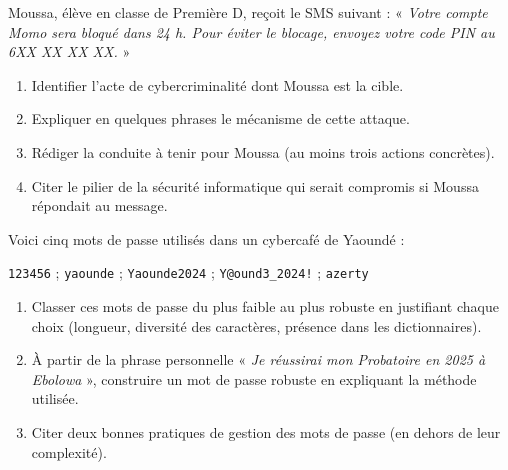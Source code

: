 \documentclass[11pt]{article}
\newcounter{popsec}
\newcounter{popsub}
\newcommand{\courssub}[1]{%
  \stepcounter{popsub}%
  \par\vspace{9pt}\noindent{\popxbold\fontsize{11.5}{13}\selectfont\color{popink}{\color{poporange}\thepopsec.\thepopsub}\hspace{6pt}#1}\par\nopagebreak\vspace{4pt}
}
\begin{document}
\courssub{Je m'entraîne}

\begin{exercice}
Moussa, élève en classe de Première D, reçoit le SMS suivant : « \emph{Votre compte Momo sera bloqué dans 24 h. Pour éviter le blocage, envoyez votre code PIN au 6XX XX XX XX.} »
\begin{enumerate}
\item Identifier l'acte de cybercriminalité dont Moussa est la cible.
\item Expliquer en quelques phrases le mécanisme de cette attaque.
\item Rédiger la conduite à tenir pour Moussa (au moins trois actions concrètes).
\item Citer le pilier de la sécurité informatique qui serait compromis si Moussa répondait au message.
\end{enumerate}
\end{exercice}

\begin{exercice}
Voici cinq mots de passe utilisés dans un cybercafé de Yaoundé :
\begin{center}
\texttt{123456} \quad ; \quad \texttt{yaounde} \quad ; \quad \texttt{Yaounde2024} \quad ; \quad \texttt{Y@ound3\_2024!} \quad ; \quad \texttt{azerty}
\end{center}
\begin{enumerate}
\item Classer ces mots de passe du plus faible au plus robuste en justifiant chaque choix (longueur, diversité des caractères, présence dans les dictionnaires).
\item À partir de la phrase personnelle « \emph{Je réussirai mon Probatoire en 2025 à Ebolowa} », construire un mot de passe robuste en expliquant la méthode utilisée.
\item Citer deux bonnes pratiques de gestion des mots de passe (en dehors de leur complexité).
\end{enumerate}
\end{exercice}
\end{document}
